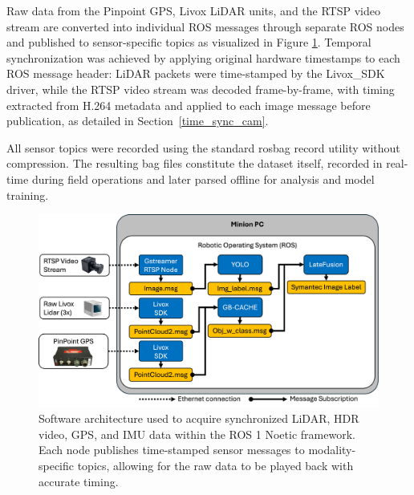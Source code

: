 \documentclass{erauthesis}
\begin{document}
Raw data from the Pinpoint GPS, Livox LiDAR units, and the RTSP video stream are converted into individual ROS messages through separate ROS nodes and published to sensor-specific topics as visualized in Figure \ref{fig:ros}.  
Temporal synchronization was achieved by applying original hardware timestamps to each ROS message header: LiDAR packets were time-stamped by the Livox\_SDK driver, while the RTSP video stream was decoded frame-by-frame, with timing extracted from H.264 metadata and applied to each image message before publication, as detailed in Section~\ref{time_sync_cam}.

All sensor topics were recorded using the standard rosbag record utility without compression. 
The resulting bag files constitute the dataset itself, recorded in real-time during field operations and later parsed offline for analysis and model training.




\begin{figure}[htbp]
    \centering
    \includegraphics[width=0.95\linewidth]{Images/ros.png}
    \caption{Software architecture used to acquire synchronized LiDAR, HDR video, GPS, and IMU data within the ROS 1 Noetic framework. Each node publishes time-stamped sensor messages to modality-specific topics, allowing for the raw data to be played back with accurate timing.}
    \label{fig:ros}
\end{figure}
\end{document}
